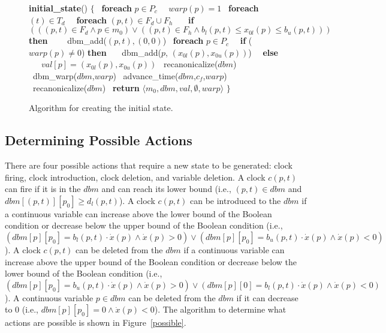 \documentclass[11pt,times]{article}
\begin{document}
  \begin{figure}[htbp]
    \begin{algorithm}
      \small {\bf{initial\_state}}() $\{$
      \ {\bf{foreach}} $p \in P_c$ 
      \ \ $warp(p)=1$
      \ {\bf{foreach}} $(t) \in T_d$
      \ \ {\bf{foreach}} $(p, t)  \in F_d \cup F_h$
      \ \ \ {\bf{if}} $(((p, t) \in F_d \wedge p \in m_0) \vee ((p, t) \in F_h \wedge b_l(p, t) \leq x_{0l} (p) \leq  b_u(p, t)))$ {\bf{then}}
      \ \ \ \ dbm\_add($(p, t), (0, 0)$)
      \ {\bf{foreach}} $p \in P_c$
      \ \ {\bf{if}} ($warp(p) \neq 0$) {\bf{then}}
      \ \ \ dbm\_add($p$, $(x_{0l}(p), x_{0u}(p))$)
      \ \ {\bf{else}}
      \ \ \ $val[p] = (x_{0l}(p), x_{0u}(p))$
      \ recanonicalize($dbm$)
      \ dbm\_warp($dbm$,$warp$)
      \ advance\_time($dbm$,$c_f$,$warp$)
      \ recanonicalize($dbm$)
      \ {\bf{return}} $\langle m_0,dbm,val,\emptyset,warp \rangle$
      $\}$
    \end{algorithm}
    \caption{\label{initial_zone}Algorithm for creating the initial state.}
  \end{figure}
  
\subsection{Determining Possible Actions}

There are four possible actions that require a new state to be generated:
clock firing, clock introduction, clock deletion, and variable deletion.
A clock $c(p, t)$ can fire if it is in the $dbm$ and can reach its lower bound 
(i.e., $(p, t) \in dbm$ and $dbm[(p, t)][p_0] \geq d_l(p, t)$).  
A clock $c(p, t)$ can be introduced to the $dbm$ if a continuous variable can
increase above the lower bound of the Boolean condition or decrease below the
upper bound of the Boolean condition (i.e., 
$(dbm[p][p_0] = b_l(p,t) \cdot \dot{x}(p) \wedge \dot{x}(p) > 0) \vee 
 (dbm[p][p_0] = b_u(p,t) \cdot \dot{x}(p) \wedge \dot{x}(p) < 0)$).
A clock $c(p, t)$ can be deleted from the $dbm$ if a continuous variable can
increase above the upper bound of the Boolean condition or decrease below the
lower bound of the Boolean condition (i.e., 
$(dbm[p][p_0] = b_u(p,t) \cdot \dot{x}(p) \wedge \dot{x}(p) > 0) \vee 
 (dbm[p][0] = b_l(p,t) \cdot \dot{x}(p) \wedge \dot{x}(p) < 0)$).
A continuous variable $p \in dbm$ can be deleted from the $dbm$ if it can
decrease to 0 (i.e., $dbm[p][p_0] = 0 \wedge \dot{x}(p) < 0$).
The algorithm to determine what actions are possible is shown in
Figure~\ref{possible}. 
\end{document}

